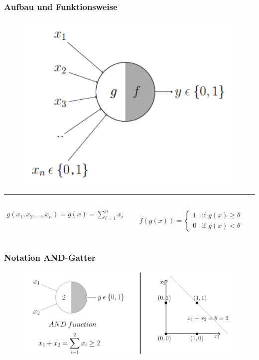 \begin{frame}
\frametitle{Aufbau und Funktionsweise}
\begin{figure}
	\includegraphics[width=.5\linewidth]{./geschichtliches/mcCullochPittsNeuron/img/aufbau_alpha}
\end{figure}

\hrule

\begin{columns}

\begin{align*}
g(x_1, x_2, \dots , x_n) = g(x) = \sum_{i=1}^n x_i
\end{align*}

\begin{align*} \label{eq:aktFkt2}
f(g(x)) =\begin{cases}
	1 & \mbox{if } g(x) \geq \theta \\
    0 & \mbox{if } g(x) < \theta
  \end{cases}
\end{align*}
\end{columns}
\end{frame}


\begin{frame}
\frametitle{Notation AND-Gatter}

\begin{figure}
	\includegraphics[width=\linewidth]{./geschichtliches/mcCullochPittsNeuron/img/mpn_and_alpha}
\end{figure}
\end{frame}


